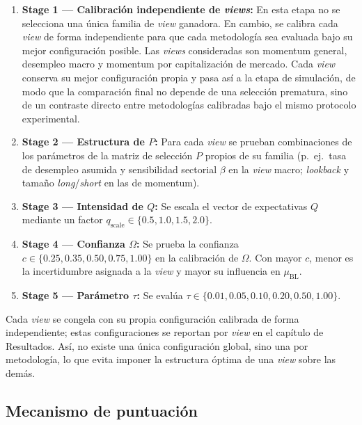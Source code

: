 \begin{enumerate}
    \item \textbf{Stage 1 --- Calibraci\'on independiente de \textit{views}:}
    En esta etapa no se selecciona una \'unica familia de \textit{view}
    ganadora. En cambio, se calibra cada \textit{view} de forma independiente
    para que cada metodolog\'ia sea evaluada bajo su mejor configuraci\'on
    posible. Las \textit{views} consideradas son momentum general, desempleo
    macro y momentum por capitalizaci\'on de mercado. Cada \textit{view}
    conserva su mejor configuraci\'on propia y pasa as\'i a la etapa de
    simulaci\'on, de modo que la comparaci\'on final no depende de una
    selecci\'on prematura, sino de un contraste directo entre metodolog\'ias
    calibradas bajo el mismo protocolo experimental.

    \item \textbf{Stage 2 --- Estructura de $P$:} Para cada \textit{view} se
    prueban combinaciones de los par\'ametros de la matriz de selecci\'on $P$
    propios de su familia (p.\ ej.\ tasa de desempleo asumida y sensibilidad
    sectorial $\beta$ en la \textit{view} macro; \textit{lookback} y tama\~no
    \textit{long}/\textit{short} en las de momentum).

    \item \textbf{Stage 3 --- Intensidad de $Q$:} Se escala el vector de
    expectativas $Q$ mediante un factor $q_{\text{scale}} \in \{0.5, 1.0, 1.5,
    2.0\}$.

    \item \textbf{Stage 4 --- Confianza $\Omega$:} Se prueba la confianza
    $c \in \{0.25, 0.35, 0.50, 0.75, 1.00\}$ en la calibraci\'on de $\Omega$.
    Con mayor $c$, menor es la incertidumbre asignada a la \textit{view} y
    mayor su influencia en $\mu_{\text{BL}}$.

    \item \textbf{Stage 5 --- Par\'ametro $\tau$:} Se eval\'ua
    $\tau \in \{0.01, 0.05, 0.10, 0.20, 0.50, 1.00\}$.
\end{enumerate}

Cada \textit{view} se congela con su propia configuraci\'on calibrada de forma
independiente; estas configuraciones se reportan por \textit{view} en el cap\'itulo
de Resultados. As\'i, no existe una \'unica configuraci\'on global, sino una por
metodolog\'ia, lo que evita imponer la estructura \'optima de una \textit{view}
sobre las dem\'as.

\subsection{Mecanismo de puntuaci\'on}

